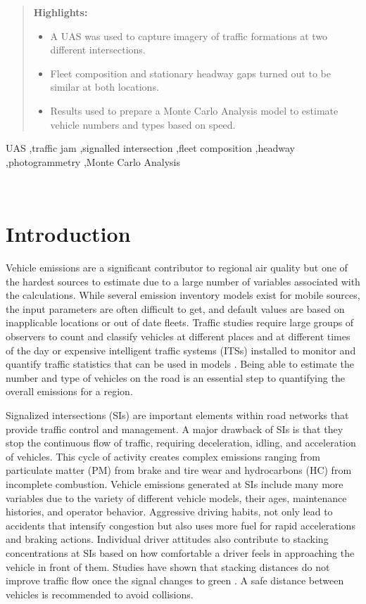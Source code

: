 \documentclass[preprint,12pt,a4paper]{elsarticle}
\begin{document}
\begin{linenumbers}
\begin{frontmatter}
\begin{abstract}
\textbf{Highlights:}
\begin{itemize}
  \item A UAS was used to capture imagery of traffic formations at two different intersections.
  \item Fleet composition and stationary headway gaps turned out to be similar at both locations.
  \item Results used to prepare a Monte Carlo Analysis model to estimate vehicle numbers and types based on speed.
 
\end{itemize}

\end{abstract}

\begin{keyword}
UAS \sep traffic jam \sep signalled intersection \sep fleet composition \sep headway \sep photogrammetry \sep Monte Carlo Analysis
\end{keyword}

\end{frontmatter}
 
\section{Introduction}

Vehicle emissions are a significant contributor to regional air quality but one of the hardest sources to estimate due to a large number of variables associated with the calculations. While several emission inventory models exist for mobile sources, the input parameters are often difficult to get, and default values are based on inapplicable locations or out of date fleets. Traffic studies require large groups of observers to count and classify vehicles at different places and at different times of the day or expensive intelligent traffic systems (ITSs) installed to monitor and quantify traffic statistics that can be used in models \citep{Suzuki2015}. Being able to estimate the number and type of vehicles on the road is an essential step to quantifying the overall emissions for a region. 

Signalized intersections (SIs) are important elements within road networks that provide traffic control and management. A major drawback of SIs is that they stop the continuous flow of traffic, requiring deceleration, idling, and acceleration of vehicles. This cycle of activity creates complex emissions ranging from particulate matter (PM) from brake and tire wear and hydrocarbons (HC) from incomplete combustion. Vehicle emissions generated at SIs include many more variables due to the variety of different vehicle models, their ages, maintenance histories, and operator behavior. Aggressive driving habits, not only lead to accidents that intensify congestion but also uses more fuel for rapid accelerations and braking actions. Individual driver attitudes also contribute to stacking concentrations at SIs based on how comfortable a driver feels in approaching the vehicle in front of them. Studies have shown that stacking distances do not improve traffic flow once the signal changes to green  \citep{Ahmadi2017}. A safe distance between vehicles is recommended to avoid collisions.


\end{linenumbers}
\end{document}
